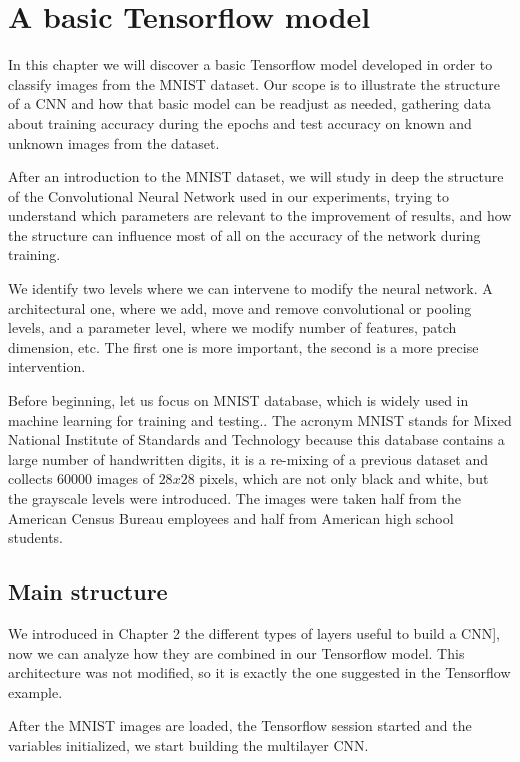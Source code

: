 \chapter{A basic Tensorflow model}\label{ch:basic_tf_model}

In this chapter we will discover a basic Tensorflow model developed in order to classify images from the MNIST dataset. Our scope is to illustrate the structure of a \acs{CNN} and how that basic model can be readjust as needed, gathering data about training accuracy during the epochs and test accuracy on known and unknown images from the dataset.

After an introduction to the MNIST dataset, we will study in deep the structure of the Convolutional Neural Network used in our experiments, trying to understand which parameters are relevant to the improvement of results, and how the structure can influence most of all on the accuracy of the network during training.

We identify two levels where we can intervene to modify the neural network. A architectural one, where we add, move and remove convolutional or pooling levels, and a parameter level, where we modify number of features, patch dimension, etc. The first one is more important, the second is a more precise intervention.

Before beginning, let us focus on MNIST database, which is widely used in machine learning for training and testing.. The acronym MNIST stands for Mixed National Institute of Standards and Technology because this database contains a large number of handwritten digits, it is a re-mixing of a previous dataset and collects 60000 images of $28x28$ pixels, which are not only black and white, but the grayscale levels were introduced. The images were taken half from the American Census Bureau employees and half from American high school students.

\section{Main structure}

We introduced in Chapter 2 the different types of layers useful to build a \acs{CNN}], now we can analyze how they are combined in our Tensorflow model. This architecture was not modified, so it is exactly the one suggested in the Tensorflow example.

After the MNIST images are loaded, the Tensorflow session started and the variables initialized, we start building the multilayer \acs{CNN}.


